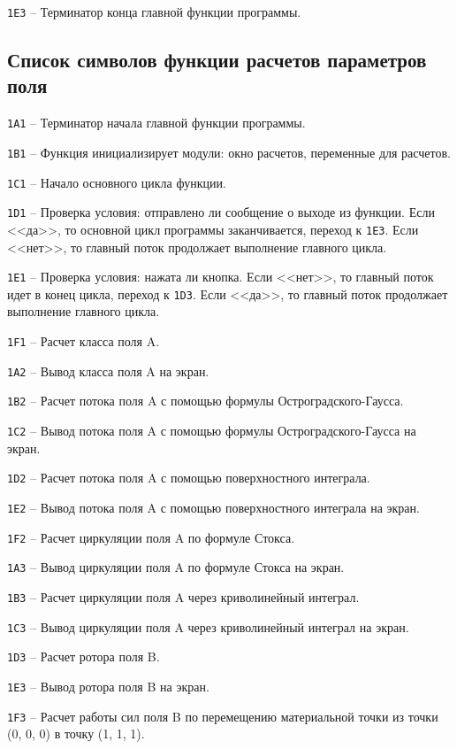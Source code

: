 \documentclass[14pt,a4paper,final]{extreport}
\begin{document}
\texttt{1E3} -- Терминатор конца главной функции программы.

\pagebreak

\pagebreak

\subsection{Список символов функции расчетов параметров поля}

\texttt{1A1} -- Терминатор начала главной функции программы.
 
\texttt{1B1} -- Функция инициализирует модули: окно расчетов, переменные для расчетов.

\texttt{1C1} -- Начало основного цикла функции.

\texttt{1D1} -- Проверка условия: отправлено ли сообщение о выходе из функции. Если <<да>>, то основной цикл программы заканчивается, переход к \texttt{1E3}. Если <<нет>>, то главный поток продолжает выполнение главного цикла.

\texttt{1E1} -- Проверка условия: нажата ли кнопка. Если <<нет>>, то главный поток идет в конец цикла, переход к \texttt{1D3}. Если <<да>>, то главный поток продолжает выполнение главного цикла.

\texttt{1F1} -- Расчет класса поля A.

\texttt{1А2} -- Вывод класса поля A на экран.

\texttt{1B2} --  Расчет потока поля A с помощью формулы Остроградского-Гаусса.

\texttt{1C2} -- Вывод потока поля A с помощью формулы Остроградского-Гаусса на экран.

\texttt{1D2} --  Расчет потока поля A с помощью поверхностного интеграла.

\texttt{1E2} -- Вывод потока поля A с помощью поверхностного интеграла на экран.

\texttt{1F2} --  Расчет циркуляции поля A по формуле Стокса.

\texttt{1A3} -- Вывод циркуляции поля A по формуле Стокса на экран.

\texttt{1B3} --  Расчет циркуляции поля A через криволинейный интеграл.

\texttt{1C3} -- Вывод циркуляции поля A через криволинейный интеграл на экран.

\texttt{1D3} --  Расчет ротора поля B.

\texttt{1E3} -- Вывод ротора поля B на экран.

\texttt{1F3} --  Расчет работы сил поля B по перемещению материальной точки из точки (0, 0, 0) в точку (1, 1, 1).
\end{document}
